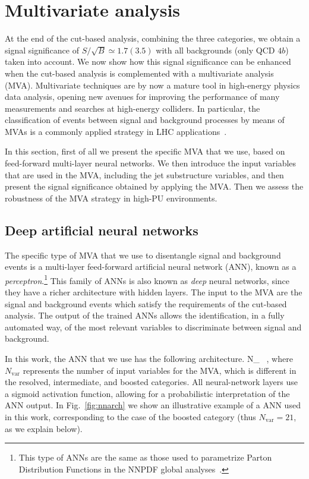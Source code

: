 
\section{Multivariate analysis}
\label{sec:mva}

At the end of the cut-based analysis,
combining the three categories,
we obtain a signal significance of $S/\sqrt{B}\simeq 1.7 (3.5)$
with all backgrounds (only QCD $4b$) taken into account.
%
We now show how this signal significance
 can be enhanced when the cut-based analysis
 is complemented with a multivariate analysis (MVA).
%
 Multivariate techniques are by now a mature tool
 in high-energy physics data analysis, opening
 new avenues for improving the performance
of many measurements and searches at high-energy colliders.
%
In particular, the classification of events between signal and
background processes by means of MVAs is a
commonly applied strategy in LHC
applications~\cite{Baldi:2014pta,Aaltonen:2012qt,
  Wardrope:2014kya,Chatrchyan:2013zna,Dall'Osso:2015aia}.

In this section, first of all we present the specific MVA that we use,
based on feed-forward multi-layer neural networks.
%
We then introduce the input variables that are
used in the MVA, including the jet substructure
variables, and then present the signal significance obtained
by applying the MVA.
%
Then we assess the robustness of the MVA strategy in
high-PU environments.

\subsection{Deep artificial neural networks}

%
The specific type of  MVA that we use to
disentangle signal and background events is
a multi-layer feed-forward artificial neural network (ANN),
known as a {\it perceptron}.\footnote{This type of ANNs are the same
  as those used to parametrize Parton Distribution Functions
in the NNPDF global analyses~\cite{DelDebbio:2004qj,Ball:2008by,Ball:2011mu,Ball:2010de}.}
%
This family of ANNs is also known as {\it deep} neural networks, since they have
a richer architecture with hidden layers.
%
The input to the MVA are the
signal and background
events which satisfy the requirements of the
cut-based analysis.
%
The output of the trained ANNs allows the identification, in a fully automated way,
of the most relevant variables to discriminate between 
signal and background.

In this work, the ANN that we use has the following architecture.
\be
\label{eq:nn1}
N_{} \, ,
\ee
where $N_{\mathrm{var}}$ represents the number of input variables for the MVA,
which is different in the resolved, intermediate, and boosted categories.
%
All neural-network layers use a sigmoid activation function, allowing
for a probabilistic
interpretation of the ANN output.
%
In Fig.~\ref{fig:nnarch} we show an illustrative
example of a ANN used in this work, corresponding 
to the case of the boosted category (thus $N_{\mathrm{var}}=21$, as we explain below).

